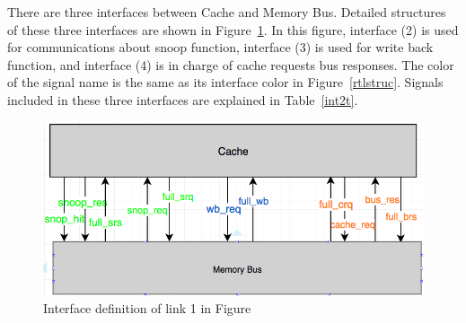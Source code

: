 \documentclass[12pt,frontmatter,copyright,thesis]{usfmanus}
\begin{document}
There are three interfaces between Cache and Memory Bus. Detailed
structures of these three interfaces are shown in Figure~\ref{int2}.
In this figure, interface (2) is used for
communications about snoop function,
interface (3) is used for write back function, and
interface (4) is in charge of cache requests bus responses.
The color of the signal name is the same as its interface color in Figure~\ref{rtlstruc}.
 Signals included in these three interfaces are
explained in Table~\ref{int2t}.
\begin{figure}[h]
\centering
    \includegraphics[width=5in]{int2.png}
    \caption{Interface definition of link 1 in Figure}
    \label{int2}
 \end{figure}
\end{document}
